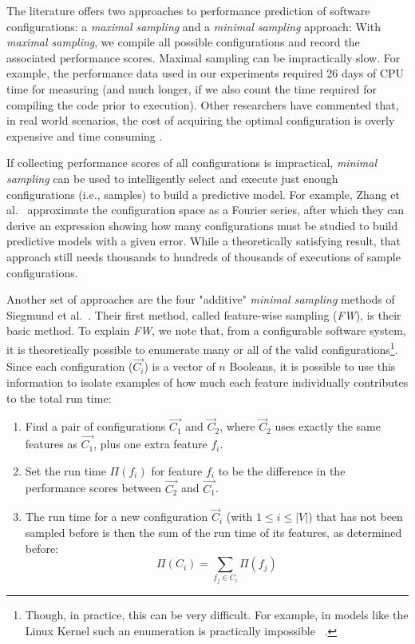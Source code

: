 \documentclass[smallextended]{svjour3}       %
\begin{document}
The literature offers two approaches to performance prediction of software configurations: a {\em maximal sampling} and a {\em minimal sampling} approach: 
With {\em maximal sampling}, we compile all  possible configurations and record the associated performance scores. 
Maximal sampling  can be impractically slow. For example, the performance data used in our experiments required  26 days of CPU time for measuring (and much longer, if we also count the time required for compiling the code prior to execution). 
 Other researchers have commented that,  in 
 real world scenarios, the cost of acquiring the optimal configuration is overly expensive and time consuming \cite{weiss2008maximizing}.
 
 If collecting performance scores of all configurations is impractical,  {\em minimal sampling} 
 can be used to intelligently select and execute just enough configurations (i.e., samples) to build a
 predictive model.
 For example, Zhang et al.~\cite{zhang2015performance} approximate the
configuration space as a Fourier series, after which they can derive an expression showing how many configurations must be studied
 to build predictive models with a given error. While a theoretically satisfying result, that approach still needs thousands to hundreds of thousands of executions of sample
 configurations.  

Another set of approaches are the four "additive" {\em minimal sampling} methods of Siegmund et al.~\cite{siegmund2012predicting}.
Their first method, called feature-wise sampling ({\em FW}), is their basic method.
To explain {\em FW}, we note that, from a configurable software system, it is theoretically possible to enumerate many or all of the valid configurations\footnote{Though, in practice, this can be very difficult. For example, in models like the Linux Kernel such an enumeration is practically impossible ~\cite{sayyad13b}.}. 
Since each configuration ($\vec{C_i}$) is a vector of $n$ Booleans, it  is possible to use this information to isolate examples of how much each feature individually contributes to the total run time:
\begin{enumerate}
\item Find a pair of  configurations $\vec{C_1}$ and $\vec{C}_2$, where $\vec{C}_2$ uses exactly the same features as $\vec{C_1}$, plus one  extra feature $f_i$.
\item Set the run time $\Pi(f_i)$ for feature $f_i$ to be the difference in the performance scores between $\vec{C_2}$ and $\vec{C_1}$.
\item The run time  for a new configuration  $\vec{C}_i$ (with $1\leq i\leq \left\vert{V}\right\vert$) that has not been sampled before is then the sum of the run time of its features, as determined before:
\begin{equation}
  \Pi(C_i) = \sum_{f_j \in C_i}\Pi(f_j)  
\end{equation}
\end{enumerate}
\end{document}
